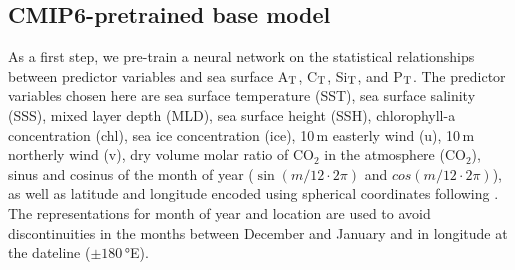 \documentclass{article}
\begin{document}
	\subsection{CMIP6-pretrained base model} \label{sect:cmip6-pretraining}
	As a first step, we pre-train a neural network on the statistical relationships between predictor variables and sea surface A$_\textup{T}$, C$_\textup{T}$, Si$_\textup{T}$, and P$_\textup{T}$. The predictor variables chosen here are sea surface temperature (SST), sea surface salinity (SSS), mixed layer depth (MLD), sea surface height (SSH), chlorophyll-a concentration (chl), sea ice concentration (ice), 10\,m easterly wind (u), 10\,m northerly wind (v),
	dry volume molar ratio of CO$_2$ in the atmosphere (CO$_2$), sinus and cosinus of the month of year ($\sin(m / 12 \cdot 2\pi)$ and $cos(m / 12 \cdot 2\pi)$), as well as latitude and longitude encoded using spherical coordinates following \cite{gade2010}. The representations for month of year and location are used to avoid discontinuities in the months between December and January and in longitude at the dateline ($\pm180$\,°E).
	
\end{document}
